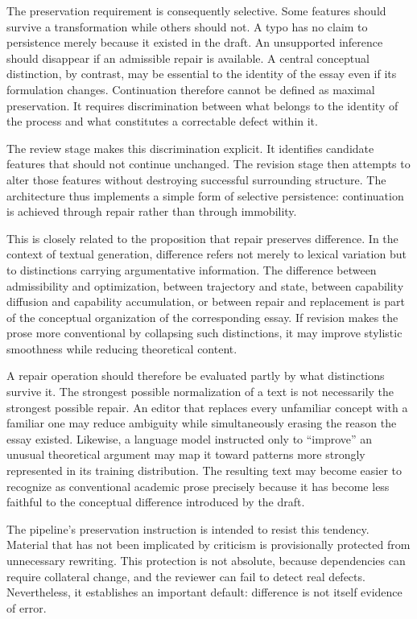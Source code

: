 \documentclass[11pt]{article}
\begin{document}
The preservation requirement is consequently selective. Some features should survive a transformation while others should not. A typo has no claim to persistence merely because it existed in the draft. An unsupported inference should disappear if an admissible repair is available. A central conceptual distinction, by contrast, may be essential to the identity of the essay even if its formulation changes. Continuation therefore cannot be defined as maximal preservation. It requires discrimination between what belongs to the identity of the process and what constitutes a correctable defect within it.

The review stage makes this discrimination explicit. It identifies candidate features that should not continue unchanged. The revision stage then attempts to alter those features without destroying successful surrounding structure. The architecture thus implements a simple form of selective persistence: continuation is achieved through repair rather than through immobility.

This is closely related to the proposition that repair preserves difference. In the context of textual generation, difference refers not merely to lexical variation but to distinctions carrying argumentative information. The difference between admissibility and optimization, between trajectory and state, between capability diffusion and capability accumulation, or between repair and replacement is part of the conceptual organization of the corresponding essay. If revision makes the prose more conventional by collapsing such distinctions, it may improve stylistic smoothness while reducing theoretical content.

A repair operation should therefore be evaluated partly by what distinctions survive it. The strongest possible normalization of a text is not necessarily the strongest possible repair. An editor that replaces every unfamiliar concept with a familiar one may reduce ambiguity while simultaneously erasing the reason the essay existed. Likewise, a language model instructed only to ``improve'' an unusual theoretical argument may map it toward patterns more strongly represented in its training distribution. The resulting text may become easier to recognize as conventional academic prose precisely because it has become less faithful to the conceptual difference introduced by the draft.

The pipeline's preservation instruction is intended to resist this tendency. Material that has not been implicated by criticism is provisionally protected from unnecessary rewriting. This protection is not absolute, because dependencies can require collateral change, and the reviewer can fail to detect real defects. Nevertheless, it establishes an important default: difference is not itself evidence of error.
\end{document}
